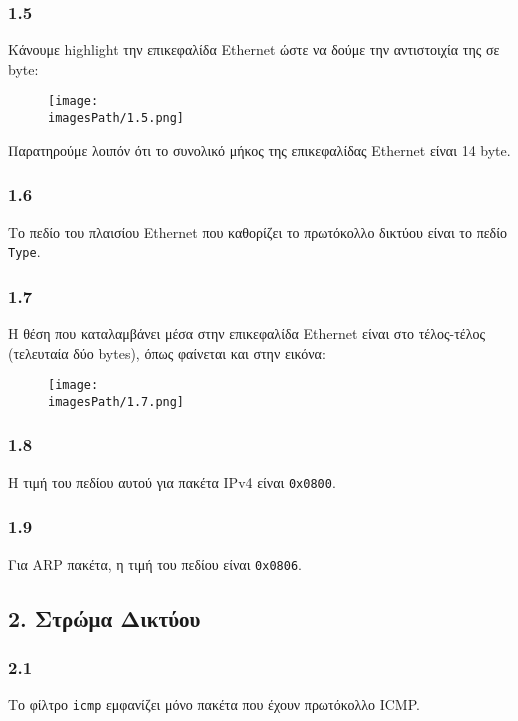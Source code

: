		\subsubsection*{1.5}
			Κάνουμε highlight την επικεφαλίδα Ethernet ώστε να δούμε την αντιστοιχία της σε byte: 
			
			\begin{figure}[H]
				\texttt{[image: \\imagesPath/1.5.png]}
			\end{figure}
		
			Παρατηρούμε λοιπόν ότι το συνολικό μήκος της επικεφαλίδας Ethernet είναι 14 byte.
			
		\subsubsection*{1.6}
		
			Το πεδίο του πλαισίου Ethernet που καθορίζει το πρωτόκολλο δικτύου είναι το πεδίο \verb|Type|.
			
		
		\subsubsection*{1.7}
			
			Η θέση που καταλαμβάνει μέσα στην επικεφαλίδα Ethernet είναι στο τέλος-τέλος (τελευταία δύο bytes), όπως φαίνεται και στην εικόνα: 
			
			\begin{figure}[H]
				\texttt{[image: \\imagesPath/1.7.png]}
			\end{figure}
		
		\subsubsection*{1.8}
			Η τιμή του πεδίου αυτού για πακέτα IPv4 είναι \verb|0x0800|.
		
		\subsubsection*{1.9}
			Για ARP πακέτα, η τιμή του πεδίου είναι \verb|0x0806|.
	
	\subsection*{2. Στρώμα Δικτύου}
		
		\subsubsection*{2.1}
			Το φίλτρο \verb|icmp| εμφανίζει μόνο πακέτα που έχουν πρωτόκολλο ICMP.
		

